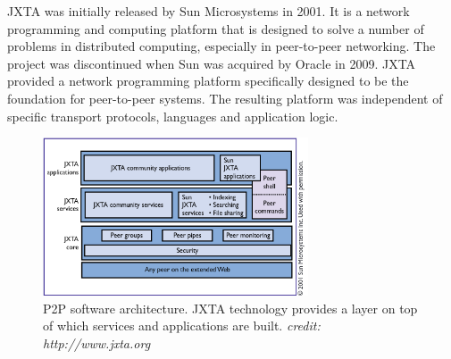 JXTA\cite{gong2001jxta} was initially released by Sun Microsystems in 2001. It is a network programming and computing platform that is designed to solve a number of problems in distributed computing, especially in peer-to-peer networking\cite{gong2001jxta}. The project was discontinued when Sun was acquired by Oracle in 2009. JXTA provided a network programming platform specifically designed to be the foundation for peer-to-peer systems. The resulting platform was independent of specific transport protocols, languages and application logic.


\begin{figure}[ht]
    \centering
    \includegraphics[width=0.7\textwidth]{imgs/Screenshot from 2022-04-16 09-32-03.png}
    \caption{P2P software architecture. JXTA technology provides a layer on top of which services and applications are built. \textit{credit: http://www.jxta.org}}
    \label{fig:jxta_architecture}
\end{figure}


